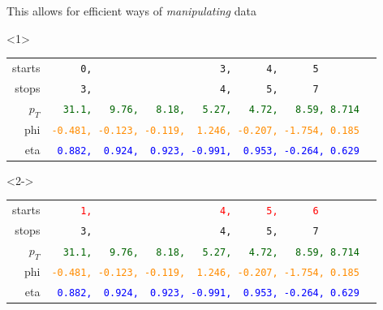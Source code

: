 \documentclass[aspectratio=169]{beamer}
\begin{document}
\begin{frame}[fragile]{This allows for efficient ways of {\it manipulating} data}
\vspace{0.25 cm}
\begin{onlyenv}<1>
\begin{tabular}{r l}
\small starts  &                    {\tt\scriptsize \ \ \ \ \ 0,\ \ \ \ \ \ \ \ \ \ \ \ \ \ \ \ \ \ \ \ \ \ 3,\ \ \ \ \ \ 4,\ \ \ \ \ \ 5\ \ \ \ \ \ \ \ \ } \\
\small stops   &                    {\tt\scriptsize \ \ \ \ \ 3,\ \ \ \ \ \ \ \ \ \ \ \ \ \ \ \ \ \ \ \ \ \ 4,\ \ \ \ \ \ 5,\ \ \ \ \ \ 7\ \ \ \ \ \ \ \ \ } \\
\small $p_T$ & \textcolor{darkgreen}{\tt\scriptsize \ \ 31.1,\ \ \ 9.76,\ \ \ 8.18,\ \ \ 5.27,\ \ \ 4.72,\ \ \ 8.59, 8.714} \\
\small phi &  \textcolor{darkorange}{\tt\scriptsize -0.481,\ -0.123,\ -0.119,\ \ 1.246,\ -0.207,\ -1.754,\ 0.185} \\
\small eta &        \textcolor{blue}{\tt\scriptsize \ 0.882,\ \ 0.924,\ \ 0.923,\ -0.991,\ \ 0.953,\ -0.264,\ 0.629} \\
\end{tabular}
\end{onlyenv}\begin{onlyenv}<2->
\begin{tabular}{r l}
\small starts  &     \textcolor{red}{\tt\scriptsize \ \ \ \ \ 1,\ \ \ \ \ \ \ \ \ \ \ \ \ \ \ \ \ \ \ \ \ \ 4,\ \ \ \ \ \ 5,\ \ \ \ \ \ 6\ \ \ \ \ \ \ \ \ } \\
\small stops   &                    {\tt\scriptsize \ \ \ \ \ 3,\ \ \ \ \ \ \ \ \ \ \ \ \ \ \ \ \ \ \ \ \ \ 4,\ \ \ \ \ \ 5,\ \ \ \ \ \ 7\ \ \ \ \ \ \ \ \ } \\
\small $p_T$ & \textcolor{darkgreen}{\tt\scriptsize \ \ 31.1,\ \ \ 9.76,\ \ \ 8.18,\ \ \ 5.27,\ \ \ 4.72,\ \ \ 8.59, 8.714} \\
\small phi &  \textcolor{darkorange}{\tt\scriptsize -0.481,\ -0.123,\ -0.119,\ \ 1.246,\ -0.207,\ -1.754,\ 0.185} \\
\small eta &        \textcolor{blue}{\tt\scriptsize \ 0.882,\ \ 0.924,\ \ 0.923,\ -0.991,\ \ 0.953,\ -0.264,\ 0.629} \\
\end{tabular}\end{onlyenv}

\vspace{0.5 cm}
\end{frame}
\end{document}
